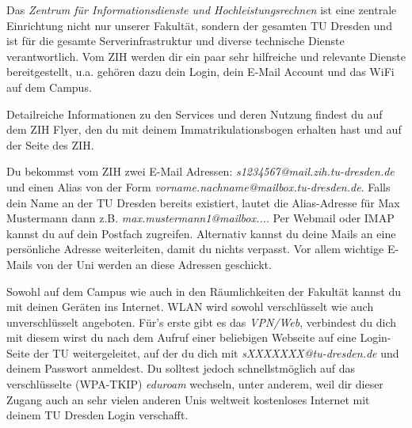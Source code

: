 

Das \textit{Zentrum für Informationsdienste und Hochleistungsrechnen} ist eine zentrale Einrichtung nicht nur unserer Fakultät, sondern der gesamten TU Dresden und ist für die gesamte Serverinfrastruktur und diverse technische Dienste verantwortlich. Vom ZIH werden dir ein paar sehr hilfreiche und relevante Dienste bereitgestellt, u.a. gehören dazu dein Login, dein E-Mail Account und das WiFi auf dem Campus.

Detailreiche Informationen zu den Services und deren Nutzung findest du auf dem ZIH Flyer, den du mit deinem Immatrikulationsbogen erhalten hast und auf der Seite des ZIH.

Du bekommst vom ZIH zwei E-Mail Adressen:
\textit{s1234567@mail.zih.tu-dresden.de} und einen Alias von der Form \textit{vorname.nachname@mailbox.tu-dresden.de}.
Falls dein Name an der TU Dresden bereits existiert, lautet die Alias-Adresse für Max Mustermann dann z.B. \textit{max.mustermann1@mailbox...}.
Per Webmail oder IMAP kannst du auf dein Postfach zugreifen.
Alternativ kannst du deine Mails an eine persönliche Adresse weiterleiten, damit du nichts verpasst.
Vor allem wichtige E-Mails von der Uni werden an diese Adressen geschickt.

Sowohl auf dem Campus wie auch in den Räumlichkeiten der Fakultät kannst du mit deinen Geräten ins Internet.
WLAN wird sowohl verschlüsselt wie auch unverschlüsselt angeboten.
Für's erste gibt es das \textit{VPN/Web}, verbindest du dich mit diesem wirst du nach dem Aufruf einer beliebigen Webseite auf eine Login-Seite der TU weitergeleitet, auf der du dich mit \textit{sXXXXXXX@tu-dresden.de} und deinem Passwort anmeldest.
Du solltest jedoch schnellstmöglich auf das verschlüsselte (WPA-TKIP) \textit{eduroam} wechseln, unter anderem, weil dir dieser Zugang auch an sehr vielen anderen Unis weltweit kostenloses Internet mit deinem TU Dresden Login verschafft.
